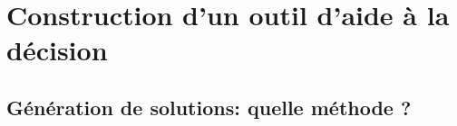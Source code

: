 \section{Construction d’un outil d’aide à la décision} %
\label{sec:construction_d_un_outil_d_aide_à_la_decision}


\subsection{Génération de solutions: quelle méthode ?} %
\label{sub:generation_de_solutions_quelle_methode}

